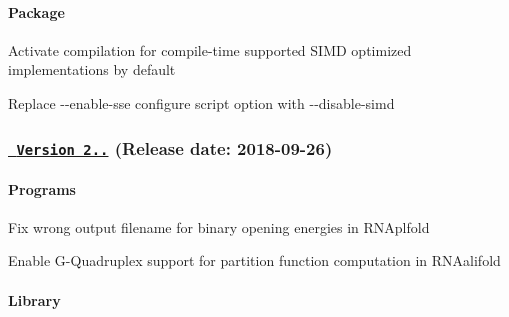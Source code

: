 \paragraph*{Package}


\begin{DoxyItemize}
\item Activate compilation for compile-\/time supported S\+I\+MD optimized implementations by default
\item Replace {\ttfamily -\/-\/enable-\/sse} configure script option with {\ttfamily -\/-\/disable-\/simd}
\end{DoxyItemize}

\subsubsection*{\href{https://github.com/ViennaRNA/ViennaRNA/compare/v2.4.9...v2.4.10}{\texttt{ Version 2..}} (Release date\+: 2018-\/09-\/26)}

\paragraph*{Programs}


\begin{DoxyItemize}
\item Fix wrong output filename for binary opening energies in {\ttfamily R\+N\+Aplfold}
\item Enable G-\/\+Quadruplex support for partition function computation in {\ttfamily R\+N\+Aalifold}
\end{DoxyItemize}

\paragraph*{Library}


